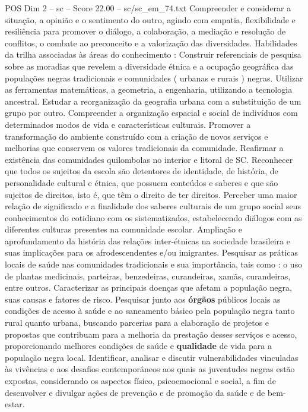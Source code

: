 \begin{textsample}{POS Dim 2 – sc – Score 22.00 – sc/sc\_em\_74.txt}
Compreender e considerar a situação, a opinião e o sentimento do outro, agindo com empatia, flexibilidade e resiliência para promover o diálogo, a colaboração, a mediação e resolução de conflitos, o combate ao preconceito e a valorização das diversidades.
Habilidades da trilha associadas às áreas do conhecimento : Construir referenciais de pesquisa sobre as moradias que revelem a diversidade étnica e a ocupação geográfica das populações negras tradicionais e comunidades ( urbanas e rurais ) negras.
Utilizar as ferramentas matemáticas, a geometria, a engenharia, utilizando a tecnologia ancestral.
Estudar a reorganização da geografia urbana com a substituição de um grupo por outro.
Compreender a organização espacial e social de indivíduos com determinados modos de vida e características culturais.
Promover a transformação do ambiente construído com a criação de novos serviços e melhorias que conservem os valores tradicionais da comunidade.
Reafirmar a existência das comunidades quilombolas no interior e litoral de SC.
Reconhecer que todos os sujeitos da escola são detentores de identidade, de história, de personalidade cultural e étnica, que possuem conteúdos e saberes e que são sujeitos de direitos, isto é, que têm o direito de ter direitos.
Perceber uma maior relação de significado e a finalidade dos saberes culturais de um grupo social seus conhecimentos do cotidiano com os sistematizados, estabelecendo diálogos com as diferentes culturas presentes na comunidade escolar.
Ampliação e aprofundamento da história das relações inter-étnicas na sociedade brasileira e suas implicações para os afrodescendentes e/ou imigrantes.
Pesquisar as práticas locais de saúde nas comunidades tradicionais e sua importância, tais como : o uso de plantas medicinais, parteiras, benzedeiras, curandeiras, xamãs, curandeiras, entre outros.
Caracterizar as principais doenças que afetam a população negra, suas causas e fatores de risco.
Pesquisar junto aos \textbf{órgãos} públicos locais as condições de acesso à saúde e ao saneamento básico pela população negra tanto rural quanto urbana, buscando parcerias para a elaboração de projetos e propostas que contribuam para a melhoria da prestação desses serviços e acesso, proporcionando melhores condições de saúde e \textbf{qualidade} de vida para a população negra local.
Identificar, analisar e discutir vulnerabilidades vinculadas às vivências e aos desafios contemporâneos aos quais as juventudes negras estão expostas, considerando os aspectos físico, psicoemocional e social, a fim de desenvolver e divulgar ações de prevenção e de promoção da saúde e de bem-estar.

\end{textsample}
